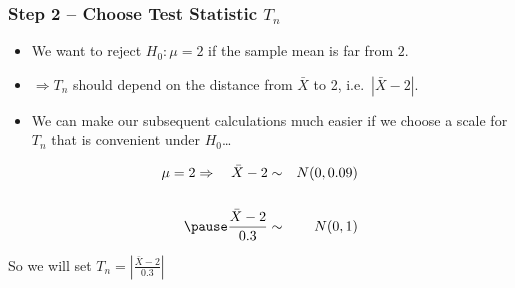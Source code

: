 \begin{frame}
  \frametitle{Step 2 -- Choose Test Statistic $T_n$}
  \begin{itemize}
    \item We want to reject $H_0\colon \mu = 2$ if the sample mean is far from $2$. \pause
    \item $\Rightarrow T_n$ should depend on the \alert{distance} from $\bar{X}$ to 2, i.e.\ $|\bar{X} - 2|$.\pause
    \item We can make our subsequent calculations much easier if we choose a \alert{scale for $T_n$ that is convenient under $H_0$\dots}
  \end{itemize}
  \begin{eqnarray*}
    \mu=2 \Rightarrow \quad \bar{X} - 2 &\sim& N(0, 0.09) \\ \\ \pause
    \frac{\bar{X} - 2}{0.3} &\sim& N(0,1)
  \end{eqnarray*}

  \alert{So we will set $\displaystyle T_n = \left|\frac{\bar{X} - 2}{0.3}\right|$}

\end{frame}

